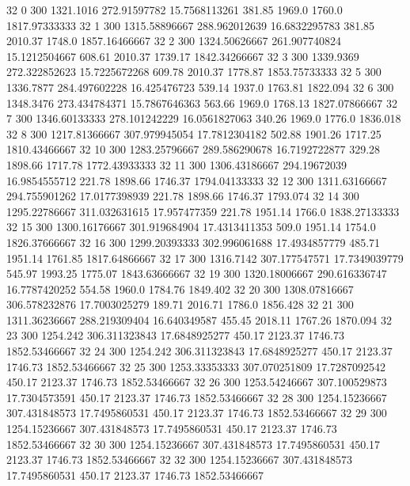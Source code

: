 32  0  300  1321.1016  272.91597782  15.7568113261  381.85  1969.0  1760.0  1817.97333333 
32  1  300  1315.58896667  288.962012639  16.6832295783  381.85  2010.37  1748.0  1857.16466667 
32  2  300  1324.50626667  261.907740824  15.1212504667  608.61  2010.37  1739.17  1842.34266667 
32  3  300  1339.9369  272.322852623  15.7225672268  609.78  2010.37  1778.87  1853.75733333 
32  5  300  1336.7877  284.497602228  16.425476723  539.14  1937.0  1763.81  1822.094 
32  6  300  1348.3476  273.434784371  15.7867646363  563.66  1969.0  1768.13  1827.07866667 
32  7  300  1346.60133333  278.101242229  16.0561827063  340.26  1969.0  1776.0  1836.018 
32  8  300  1217.81366667  307.979945054  17.7812304182  502.88  1901.26  1717.25  1810.43466667 
32  10  300  1283.25796667  289.586290678  16.7192722877  329.28  1898.66  1717.78  1772.43933333 
32  11  300  1306.43186667  294.19672039  16.9854555712  221.78  1898.66  1746.37  1794.04133333 
32  12  300  1311.63166667  294.755901262  17.0177398939  221.78  1898.66  1746.37  1793.074 
32  14  300  1295.22786667  311.032631615  17.957477359  221.78  1951.14  1766.0  1838.27133333 
32  15  300  1300.16176667  301.919684904  17.4313411353  509.0  1951.14  1754.0  1826.37666667 
32  16  300  1299.20393333  302.996061688  17.4934857779  485.71  1951.14  1761.85  1817.64866667 
32  17  300  1316.7142  307.177547571  17.7349039779  545.97  1993.25  1775.07  1843.63666667 
32  19  300  1320.18006667  290.616336747  16.7787420252  554.58  1960.0  1784.76  1849.402 
32  20  300  1308.07816667  306.578232876  17.7003025279  189.71  2016.71  1786.0  1856.428 
32  21  300  1311.36236667  288.219309404  16.640349587  455.45  2018.11  1767.26  1870.094 
32  23  300  1254.242  306.311323843  17.6848925277  450.17  2123.37  1746.73  1852.53466667 
32  24  300  1254.242  306.311323843  17.6848925277  450.17  2123.37  1746.73  1852.53466667 
32  25  300  1253.33353333  307.070251809  17.7287092542  450.17  2123.37  1746.73  1852.53466667 
32  26  300  1253.54246667  307.100529873  17.7304573591  450.17  2123.37  1746.73  1852.53466667 
32  28  300  1254.15236667  307.431848573  17.7495860531  450.17  2123.37  1746.73  1852.53466667 
32  29  300  1254.15236667  307.431848573  17.7495860531  450.17  2123.37  1746.73  1852.53466667 
32  30  300  1254.15236667  307.431848573  17.7495860531  450.17  2123.37  1746.73  1852.53466667 
32  32  300  1254.15236667  307.431848573  17.7495860531  450.17  2123.37  1746.73  1852.53466667 


